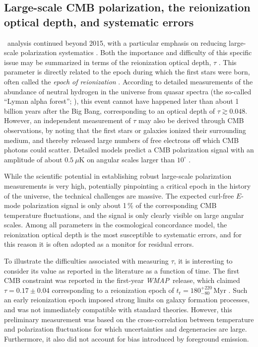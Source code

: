 \documentclass[twocolumn]{aa}
\def\WMAP{\emph{WMAP}}
\begin{document}
\subsection{Large-scale CMB polarization, the reionization optical depth, and systematic errors}
\label{sec:tau_intro}


\Planck\ analysis continued beyond 2015, with a particular emphasis on
reducing large-scale polarization systematics
\citep{planck2016-l01}. Both the importance and difficulty of this
specific issue may be summarized in terms of the reionization optical depth, $\tau$
\citep[e.g.,][]{planck2014-a25}. This parameter is directly related to
the epoch during which the first stars
were born, often called the \emph{epoch of reionization}
\citep[e.g.,][and references therein]{loeb:2001}. According to
detailed measurements of the abundance of neutral hydrogen in the
universe from quasar spectra (the so-called ``Lyman alpha forest'';
\citealp{gunn:1965}), this event cannot have happened later than about
1 billion years after the Big Bang, corresponding to an optical depth
of $\tau\gtrsim0.048$. However, an independent measurement of $\tau$
may also be derived through CMB observations, by noting that the first
stars or galaxies ionized their surrounding medium, and thereby
released large numbers of free electrons off which CMB photons could
scatter. Detailed models predict a CMB polarization signal with an
amplitude of about $0.5~\mu\textrm{K}$ on angular scales larger
than $10^{\circ}$ \citep[e.g.,][and references
  therein]{alvarez:2006}.

While the scientific potential in
establishing robust large-scale polarization measurements is very
high, potentially pinpointing a critical epoch in the history of the
universe, the technical challenges are massive. The expected curl-free
$E$-mode polarization signal is only about 1\,\% of the corresponding
CMB temperature fluctuations, and the signal is only clearly visible on large
angular scales. Among all parameters in the cosmological concordance
model, the reionization optical depth is the most susceptible to
systematic errors, and for this reason it is often adopted as a
monitor for residual errors.

To illustrate the difficulties associated with measuring $\tau$, it is
interesting to consider its value as reported in the literature as a
function of time. The first CMB constraint was reported in the
first-year \WMAP\ release, which claimed $\tau=0.17\pm0.04$
corresponding to a reionization epoch of $t_{\mathrm{r}} =
180^{+220}_{-80}\,\textrm{Myr}$ \citep{kogut2003}. Such an early
reionization epoch imposed strong limits on galaxy formation
processes, and was not immediately compatible with standard
theories. However, this preliminary measurement was based on the
cross-correlation between temperature and polarization fluctuations
for which uncertainties and degeneracies are large. Furthermore, it
also did not account for bias introduced by foreground emission.
\end{document}
